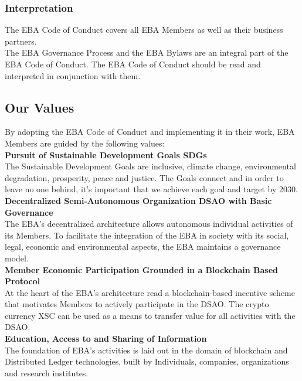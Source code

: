 \documentclass{article}
\begin{document}
\subsubsection{Interpretation}

The EBA Code of Conduct covers all EBA Members as well as their business partners. \\
The EBA Governance Process and the EBA Bylaws are an integral part of the EBA Code of Conduct. The EBA Code of Conduct should be read and interpreted in conjunction with them.

\subsection{Our Values}

By adopting the EBA Code of Conduct and implementing it in their work, EBA Members are guided by the following values: \\

\textbf{Pursuit of Sustainable Development Goals SDGs} \\

The Sustainable Development Goals are inclusive, climate change, environmental degradation, prosperity, peace and justice. 
The Goals connect and in order to leave no one behind, it's important that we achieve each goal and target by 2030. \\

\textbf{Decentralized Semi-Autonomous Organization DSAO with Basic Governance} \\

The EBA's decentralized architecture allows autonomous individual activities of its Members. 
To facilitate the integration of the EBA in society with its social, legal, economic and environmental aspects, the EBA maintains a governance model. \\

\textbf{Member Economic Participation Grounded in a Blockchain Based Protocol} \\

At the heart of the EBA's architecture read a blockchain-based incentive scheme that motivates Members to actively participate in the DSAO. 
The crypto currency XSC can be used as a means to transfer value for all activities with the DSAO. \\

\textbf{Education, Access to and Sharing of Information} \\

The foundation of EBA's activities is laid out in the domain of blockchain and Distributed Ledger technologies, built by Individuals, companies, organizations and research institutes. \\
\end{document}

